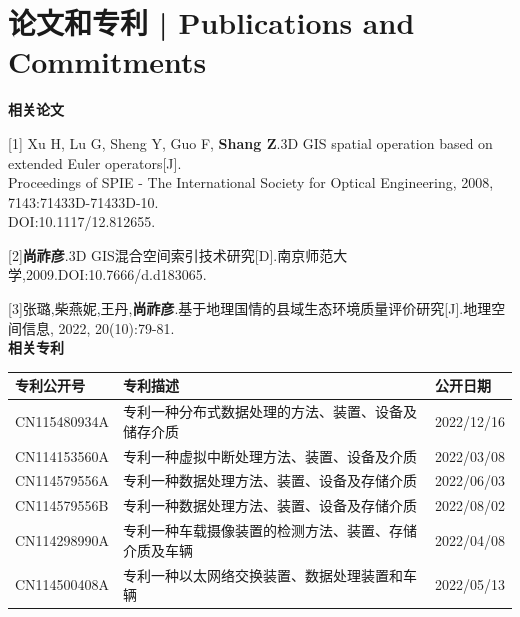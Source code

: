 \documentclass{resume}
\begin{document}
\section{论文和专利 | Publications and Commitments}

\textbf{相关论文}

[1] Xu H, Lu G, Sheng Y, Guo F, \textbf{Shang Z}.3D GIS spatial operation based on extended Euler operators[J].\\
  Proceedings of SPIE - The International Society for Optical Engineering, 2008, 7143:71433D-71433D-10.\\
  DOI:10.1117/12.812655.

[2]\textbf{尚祚彦}.3D GIS混合空间索引技术研究[D].南京师范大学,2009.DOI:10.7666/d.d183065.

[3]张璐,柴燕妮,王丹,\textbf{尚祚彦}.基于地理国情的县域生态环境质量评价研究[J].地理空间信息, 2022, 20(10):79-81.
~\\

\textbf{相关专利}
\vspace{0.6ex}{}

\setlength{\extrarowheight}{0.8ex} %
\begin{tabularx}{\textwidth }{ m{7.2em}|X|m{6.6em}}
\hline
{专利公开号} & {专利描述} & {公开日期}\\
\hline
CN115480934A & 专利一种分布式数据处理的方法、装置、设备及储存介质 & 2022/12/16\\
\hline
CN114153560A & 专利一种虚拟中断处理方法、装置、设备及介质 & 2022/03/08\\
\hline
CN114579556A & 专利一种数据处理方法、装置、设备及存储介质 & 2022/06/03\\
\hline
CN114579556B & 专利一种数据处理方法、装置、设备及存储介质 & 2022/08/02\\
\hline
CN114298990A & 专利一种车载摄像装置的检测方法、装置、存储介质及车辆 & 2022/04/08\\
\hline
CN114500408A & 专利一种以太网络交换装置、数据处理装置和车辆 & 2022/05/13\\
\hline
\end{tabularx}




  
  


%
%
\end{document}
